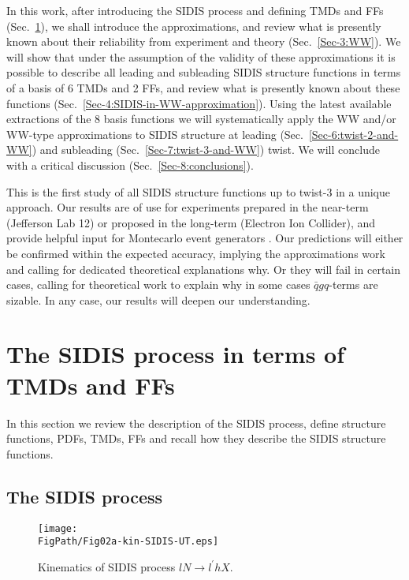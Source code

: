 \documentclass[a4paper,11pt]{article}
\newcommand*{\FigPath}{./figs}%
\begin{document}
In this work, after introducing the SIDIS process and defining TMDs and FFs 
(Sec.~\ref{Sec-2:SIDIS+TMDs+FF}), we shall introduce the approximations,
and review what is presently known about their reliability from experiment 
and theory (Sec.~\ref{Sec-3:WW}).
We will show that under the assumption of the validity of these approximations 
it is possible to describe all leading and subleading SIDIS structure functions
in terms of a basis of 6 TMDs and 2 FFs, and review what is presently known
about these functions (Sec.~\ref{Sec-4:SIDIS-in-WW-approximation}).
Using the latest available extractions of the 8 basis functions  
we will systematically apply the WW and/or WW-type approximations
to SIDIS structure at leading (Sec.~\ref{Sec-6:twist-2-and-WW}) 
and subleading (Sec.~\ref{Sec-7:twist-3-and-WW}) twist.
We will conclude with a critical discussion (Sec.~\ref{Sec-8:conclusions}).

This is the first study of all SIDIS structure functions up to twist-3 
in a unique approach. Our results are of use for experiments prepared 
in the near-term (Jefferson Lab 12) or proposed in the long-term 
(Electron Ion Collider), and provide helpful input for Montecarlo event
generators \cite{Avakian:2015vha}.
Our predictions will either be confirmed within the expected accuracy, 
implying the approximations work and calling for dedicated theoretical 
explanations why. Or they will fail in certain cases, calling for 
theoretical work to explain why in some cases $\bar{q}gq$-terms are sizable.
In any case, our results will deepen our understanding.

\newpage
\section{The SIDIS process in terms of TMDs and FFs}
\label{Sec-2:SIDIS+TMDs+FF}

In this section we review the description of the SIDIS process, 
define structure functions, PDFs, TMDs, FFs and recall how they
describe the SIDIS structure functions.

\subsection{The SIDIS process}
\label{Sec-2.1:SIDIS+structure-functions}

\begin{wrapfigure}[8]{RD}{8cm}
\vspace{-5mm}
\centering
	\texttt{[image: \\FigPath/Fig02a-kin-SIDIS-UT.eps]}
        \caption{\label{fig-kin-SIDIS}
    	Kinematics of SIDIS process $lN\to l^\prime h X$.} 
\vspace{-5mm}
\end{wrapfigure}
\end{document}
